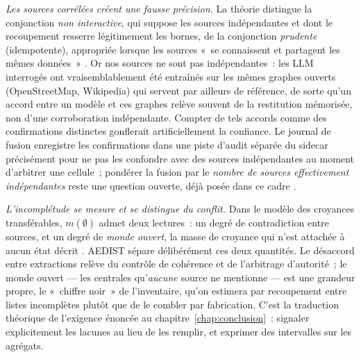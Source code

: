 \documentclass[a4paper,11pt]{report}
\begin{document}
\emph{Les sources corrélées créent une fausse précision.} La théorie distingue la conjonction \emph{non interactive}, qui suppose les sources indépendantes et dont le recoupement resserre légitimement les bornes, de la conjonction \emph{prudente} (idempotente), appropriée lorsque les sources «~se connaissent et partagent les mêmes données~» \citep{HaDuong2005}. Or nos sources ne sont pas indépendantes~: les LLM interrogés ont vraisemblablement été entraînés sur les mêmes graphes ouverts (OpenStreetMap, Wikipedia) qui servent par ailleurs de référence, de sorte qu'un accord entre un modèle et ces graphes relève souvent de la restitution mémorisée, non d'une corroboration indépendante. Compter de tels accords comme des confirmations distinctes gonflerait artificiellement la confiance. Le journal de fusion enregistre les confirmations dans une piste d'audit séparée du sidecar précisément pour ne pas les confondre avec des sources indépendantes au moment d'arbitrer une cellule~; pondérer la fusion par le \emph{nombre de sources effectivement indépendantes} reste une question ouverte, déjà posée dans ce cadre \citep{HaDuong2005}.

\emph{L'incomplétude se mesure et se distingue du conflit.} Dans le modèle des croyances transférables, $m(\emptyset)$ admet deux lectures~: un degré de contradiction entre sources, et un degré de \emph{monde ouvert}, la masse de croyance qui n'est attachée à aucun état décrit \citep{HaDuong2005}. AEDIST sépare délibérément ces deux quantités. Le désaccord entre extractions relève du contrôle de cohérence et de l'arbitrage d'autorité~; le monde ouvert --- les centrales qu'\emph{aucune} source ne mentionne --- est une grandeur propre, le «~chiffre noir~» de l'inventaire, qu'on estimera par recoupement entre listes incomplètes plutôt que de le combler par fabrication. C'est la traduction théorique de l'exigence énoncée au chapitre~\ref{chap:conclusion}~: signaler explicitement les lacunes au lieu de les remplir, et exprimer des intervalles sur les agrégats.
\end{document}
